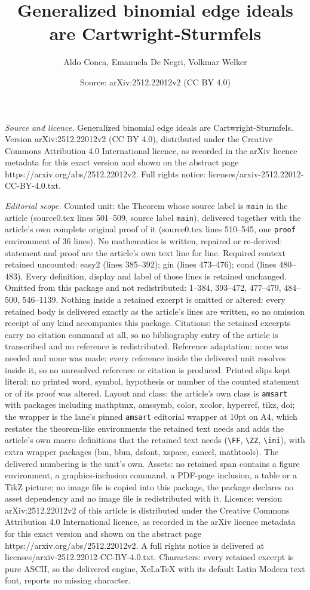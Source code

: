 \documentclass[10pt,a4paper]{amsart}
\title[Generalized binomial edge ideals are Cartwright-Sturmfels]{Generalized binomial edge ideals are Cartwright-Sturmfels}
\author{Aldo Conca, Emanuela De Negri, Volkmar Welker}
\date{Source: arXiv:2512.22012v2 (CC BY 4.0)}
\begin{document}
\maketitle

\noindent\emph{Source and licence.} Generalized binomial edge ideals are Cartwright-Sturmfels. Version arXiv:2512.22012v2 (CC BY 4.0), distributed under the Creative Commons Attribution 4.0 International licence, as recorded in the arXiv licence metadata for this exact version and shown on the abstract page https://arxiv.org/abs/2512.22012v2. Full rights notice: licenses/arxiv-2512.22012-CC-BY-4.0.txt.\par\smallskip

\noindent\textit{Editorial scope.} Counted unit: the Theorem whose source label is \texttt{main} in the article (source0.tex lines 501--509, source label \texttt{main}), delivered together with the article's own complete original proof of it (source0.tex lines 510--545, one \texttt{proof} environment of 36 lines). No mathematics is written, repaired or re-derived: statement and proof are the article's own text line for line. Required context retained uncounted: easy2 (lines 385--392); gin (lines 473--476); cond (lines 480--483). Every definition, display and label of those lines is retained unchanged. Omitted from this package and not redistributed: 1--384, 393--472, 477--479, 484--500, 546--1139. Nothing inside a retained excerpt is omitted or altered: every retained body is delivered exactly as the article's lines are written, so no omission receipt of any kind accompanies this package. Citations: the retained excerpts carry no citation command at all, so no bibliography entry of the article is transcribed and no reference is redistributed. Reference adaptation: none was needed and none was made; every reference inside the delivered unit resolves inside it, so no unresolved reference or citation is produced. Printed slips kept literal: no printed word, symbol, hypothesis or number of the counted statement or of its proof was altered. Layout and class: the article's own class is \texttt{amsart} with packages including mathptmx, amssymb, color, xcolor, hyperref, tikz, doi; the wrapper is the lane's pinned \texttt{amsart} editorial wrapper at 10pt on A4, which restates the theorem-like environments the retained text needs and adds the article's own macro definitions that the retained text needs (\texttt{\textbackslash FF}, \texttt{\textbackslash ZZ}, \texttt{\textbackslash ini}), with extra wrapper packages (bm, bbm, dsfont, xspace, cancel, mathtools). The delivered numbering is the unit's own. Assets: no retained span contains a figure environment, a graphics-inclusion command, a PDF-page inclusion, a table or a TikZ picture; no image file is copied into this package, the package declares no asset dependency and no image file is redistributed with it. Licence: version arXiv:2512.22012v2 of this article is distributed under the Creative Commons Attribution 4.0 International licence, as recorded in the arXiv licence metadata for this exact version and shown on the abstract page https://arxiv.org/abs/2512.22012v2. A full rights notice is delivered at licenses/arxiv-2512.22012-CC-BY-4.0.txt. Characters: every retained excerpt is pure ASCII, so the delivered engine, XeLaTeX with its default Latin Modern text font, reports no missing character.
\end{document}

